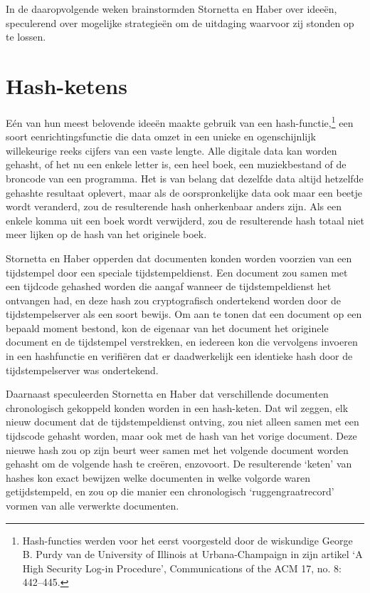 \documentclass[smalldemyvopaper,11pt,twoside,onecolumn,openright,extrafontsizes,hidelinks]{memoir}
\begin{document}
In de daaropvolgende weken brainstormden Stornetta en Haber over ideeën,
speculerend over mogelijke strategieën om de uitdaging waarvoor zij
stonden op te lossen.

\section{Hash-ketens}\label{hash-ketens}

Eén van hun meest belovende ideeën maakte gebruik van een
hash-functie,\footnote{Hash-functies werden voor het eerst voorgesteld
  door de wiskundige George B. Purdy van de University of Illinois at
  Urbana-Champaign in zijn artikel `A High Security Log-in Procedure',
  Communications of the ACM 17, no. 8: 442--445.} een soort
eenrichtingsfunctie die data omzet in een unieke en ogenschijnlijk
willekeurige reeks cijfers van een vaste lengte. Alle digitale data kan
worden gehasht, of het nu een enkele letter is, een heel boek, een
muziekbestand of de broncode van een programma. Het is van belang dat
dezelfde data altijd hetzelfde gehashte resultaat oplevert, maar als de
oorspronkelijke data ook maar een beetje wordt veranderd, zou de
resulterende hash onherkenbaar anders zijn. Als een enkele komma uit een
boek wordt verwijderd, zou de resulterende hash totaal niet meer lijken
op de hash van het originele boek.

Stornetta en Haber opperden dat documenten konden worden voorzien van
een tijdstempel door een speciale tijdstempeldienst. Een document zou
samen met een tijdcode gehashed worden die aangaf wanneer de
tijdstempeldienst het ontvangen had, en deze hash zou cryptografisch
ondertekend worden door de tijdstempelserver als een soort bewijs. Om
aan te tonen dat een document op een bepaald moment bestond, kon de
eigenaar van het document het originele document en de tijdstempel
verstrekken, en iedereen kon die vervolgens invoeren in een hashfunctie
en verifiëren dat er daadwerkelijk een identieke hash door de
tijdstempelserver was ondertekend.

Daarnaast speculeerden Stornetta en Haber dat verschillende documenten
chronologisch gekoppeld konden worden in een hash-keten. Dat wil zeggen,
elk nieuw document dat de tijdstempeldienst ontving, zou niet alleen
samen met een tijdscode gehasht worden, maar ook met de hash van het
vorige document. Deze nieuwe hash zou op zijn beurt weer samen met het
volgende document worden gehasht om de volgende hash te creëren,
enzovoort. De resulterende `keten' van hashes kon exact bewijzen welke
documenten in welke volgorde waren getijdstempeld, en zou op die manier
een chronologisch `ruggengraatrecord' vormen van alle verwerkte
documenten.
\end{document}

